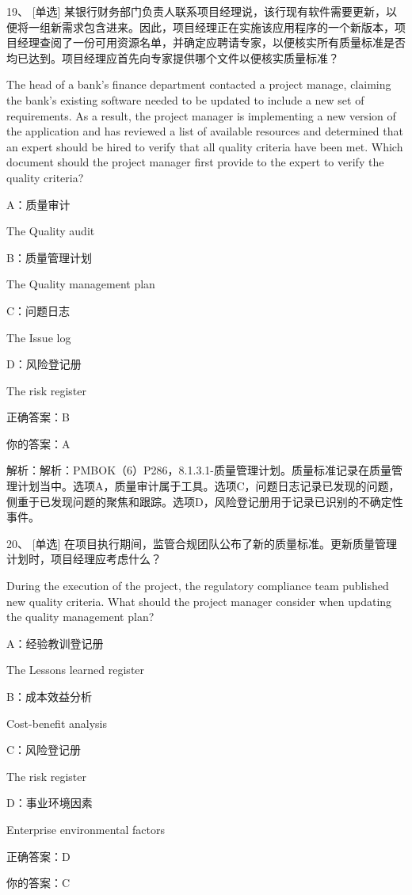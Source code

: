 19、 [单选] 某银行财务部门负责人联系项目经理说，该行现有软件需要更新，以便将一组新需求包含进来。因此，项目经理正在实施该应用程序的一个新版本，项目经理查阅了一份可用资源名单，并确定应聘请专家，以便核实所有质量标准是否均已达到。项目经理应首先向专家提供哪个文件以便核实质量标准？

The head of a bank's finance department contacted a project manage, claiming the bank's existing software needed to be updated to include a new set of requirements. As a result, the project manager is implementing a new version of the application and has reviewed a list of available resources and determined that an expert should be hired to verify that all quality criteria have been met. Which document should the project manager first provide to the expert to verify the quality criteria?

A：质量审计

The Quality audit

B：质量管理计划

The Quality management plan

C：问题日志

The Issue log

D：风险登记册

The risk register

正确答案：B

你的答案：A

解析：解析：PMBOK（6）P286，8.1.3.1-质量管理计划。质量标准记录在质量管理计划当中。选项A，质量审计属于工具。选项C，问题日志记录已发现的问题，侧重于已发现问题的聚焦和跟踪。选项D，风险登记册用于记录已识别的不确定性事件。


20、 [单选] 在项目执行期间，监管合规团队公布了新的质量标准。更新质量管理计划时，项目经理应考虑什么？

During the execution of the project, the regulatory compliance team published new quality criteria. What should the project manager consider when updating the quality management plan?

A：经验教训登记册

The Lessons learned register

B：成本效益分析

Cost-benefit analysis

C：风险登记册

The risk register

D：事业环境因素

Enterprise environmental factors

正确答案：D

你的答案：C

